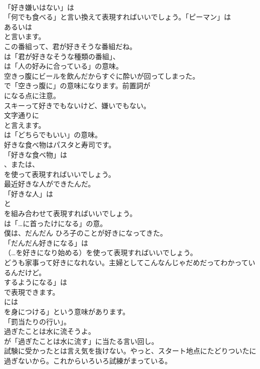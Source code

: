 \documentclass[8pt]{extreport}
\begin{document}
\begin{CJK}{UTF8}{min}
\\	「好き嫌いはない」は
\\	「何でも食べる」と言い換えて表現すればいいでしょう。「ピーマン」は
\\	あるいは
\\	と言います。	
\\	この番組って、君が好きそうな番組だね。 
\\	は「君が好きなそうな種類の番組」、
\\	は「人の好みに合っている」の意味。	
\\	空きっ腹にビールを飲んだからすぐに酔いが回ってしまった。 
\\	で「空きっ腹に」の意味になります。前置詞が 
\\	になる点に注意。	
\\	スキーって好きでもないけど、嫌いでもない。 
\\	文字通りに
\\	と言えます。
\\	は「どちらでもいい」の意味。	
\\	好きな食べ物はパスタと寿司です。 
\\	「好きな食べ物」は
\\	、または、
\\	を使って表現すればいいでしょう。	
\\	最近好きな人ができたんだ。 
\\	「好きな人」は 
\\	と 
\\	を組み合わせて表現すればいいでしょう。
\\	は「…に首ったけになる」の意。	
\\	僕は、だんだん ひろ子のことが好きになってきた。 
\\	「だんだん好きになる」は 
\\	（…を好きになり始める）を使って表現すればいいでしょう。	
\\	どうも家事って好きになれない。主婦としてこんなんじゃだめだってわかっているんだけど。 
\\	するようになる」は
\\	で表現できます。
\\	には
\\	を身につける」という意味があります。
\\	「罰当たりの行い」。	
\\	過ぎたことは水に流そうよ。 
\\	が「過ぎたことは水に流す」に当たる言い回し。	
\\	試験に受かったとは言え気を抜けない。やっと、スタート地点にたどりついたに過ぎないから。これからいろいろ試練がまっている。 

\end{CJK}
\end{document}
